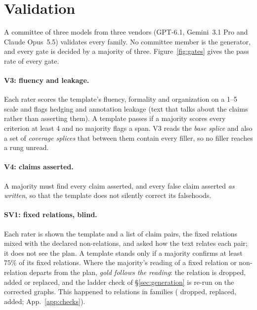 \documentclass[11pt]{article}
\begin{document}
\section{Validation}
\label{sec:validation}

A committee of three models from three vendors (GPT-6.1, Gemini~3.1 Pro and Claude Opus~5.5)
validates every family. No committee member is the generator, and every gate is decided by a
majority of three. Figure~\ref{fig:gates} gives the pass rate of every gate.

\paragraph{V3: fluency and leakage.} Each rater scores the template's fluency, formality and
organization on a 1--5 scale and flags hedging and annotation leakage (text that talks about the
claims rather than asserting them). A template passes if a majority scores every criterion at
least 4 and no majority flags a span. V3 reads the \emph{base splice} and also a set of
\emph{coverage splices} that between them contain every filler, so no filler reaches a rung
unread.

\paragraph{V4: claims asserted.} A majority must find every claim asserted, and every false claim
asserted \emph{as written}, so that the template does not silently correct its falsehoods.

\paragraph{SV1: fixed relations, blind.} Each rater is shown the template and a list of claim
pairs, the fixed relations mixed with the declared non-relations, and asked how the text relates
each pair; it does not see the plan. A template stands only if a majority confirms at least
$75\%$ of its fixed relations. Where the majority's reading of a fixed relation or non-relation
departs from the plan, \emph{gold follows the reading}: the relation is dropped, added or
replaced, and the ladder check of \S\ref{sec:generation} is re-run on the corrected graphs. This
happened to \lbGoldCorr{} relations in \lbGoldCorrFamilies{} families (\lbGoldCorrDropped{}
dropped, \lbGoldCorrReplaced{} replaced, \lbGoldCorrAdded{} added; App.~\ref{app:checks}).
\end{document}
